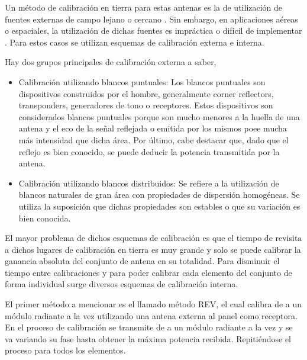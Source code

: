Un método de calibración en tierra para estas antenas es la de utilización de fuentes externas de campo lejano o cercano
\cite{Agrawal2003}. Sin embargo, en aplicaciones aéreas o espaciales, la utilización de dichas fuentes es impráctica o
difícil de implementar \cite{Aumann1989}. Para estos casos se utilizan esquemas de calibración externa e interna.

Hay dos grupos principales de calibración externa a saber,
\begin{itemize}
	\item Calibración utilizando blancos puntuales: Los blancos puntuales son dispositivos construidos por el hombre, generalmente
		corner reflectors, transponders, generadores de tono o receptores. Estos dispositivos son considerados blancos puntuales porque
		son mucho menores a la huella de una antena y el eco de la señal reflejada o emitida por los mismos poee mucha más intensidad
		que dicha área. Por último, cabe destacar que, dado que el reflejo es bien conocido, se puede deducir la potencia transmitida
		por la antena. 
	\item Calibración utilizando blancos distribuidos: Se refiere a la utilización de blancos naturales de gran área con 
		propiedades de dispersión homogéneas. Se utiliza la suposición que dichas propiedades son estables o que su variación es
		bien conocida.
\end{itemize}

El mayor problema de dichos esquemas de calibración es que el tiempo de revisita a dichos lugares de calibración en tierra es muy
grande y solo se puede calibrar la ganancia absoluta del conjunto de antena en su totalidad. Para disminuir el tiempo entre
calibraciones y para poder calibrar cada elemento del conjunto de forma individual surge diversos esquemas de calibración
interna.

El primer método a mencionar es el llamado método REV, el cual calibra de a un módulo radiante a la vez utilizando una
antena externa al panel como receptora. En el proceso de calibración se transmite de a un módulo radiante a la vez
y se va variando su fase hasta obtener la máxima potencia recibida. Repitiéndose el proceso para todos los elementos.

